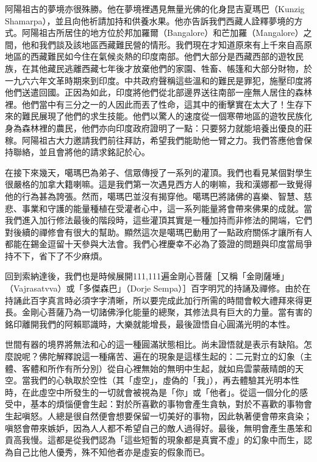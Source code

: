 阿陽祖古的夢境亦很殊勝。他在夢境裡遇見無量光佛的化身昆吉夏瑪巴（Kunzig
Shamarpa），並且向他祈請加持和供養水果。他亦告訴我們西藏人詮釋夢境的方式。阿陽祖古所居住的地方位於邦加羅爾（Bangalore）和芒加羅（Mangalore）之間，他和我們談及該地區西藏難民營的情形。我們現在才知道原來有上千來自高原地區的西藏難民如今住在氣候炎熱的印度南部。他們大部分是西藏西部的遊牧民族，在其他藏民逃離西藏七年後才放棄他們的家園、牲畜、帳篷和大部分財物，於一九六六年文革時期來到印度。中共政府聲稱這些溫和的難民是罪犯，施壓印度將他們送遣回國。正因為如此，印度將他們從北部邊界送往南部一座無人居住的森林裡。他們當中有三分之一的人因此而丟了性命，這其中的衝擊實在太大了！生存下來的難民展現了他們的求生技能。他們以驚人的速度從一個寒帶地區的遊牧民族化身為森林裡的農民，他們亦向印度政府證明了一點：只要努力就能培養出優良的莊稼。阿陽祖古大力邀請我們前往拜訪，希望我們能助他一臂之力。我們答應他會保持聯絡，並且會將他的請求銘記於心。

在接下來幾天，噶瑪巴為弟子、信眾傳授了一系列的灌頂。我們也看見某個對學生很嚴格的加拿大籍喇嘛。這是我們第一次遇見西方人的喇嘛，我和漢娜都一致覺得他的行為甚為誇張。然而，噶瑪巴並沒有揭穿他。噶瑪巴將諸佛的喜樂、智慧、慈悲、事業和守護的能量種植在受灌者心中，這一系列能量將會帶來佛果的成就。當我們進入加行修法最後的階段時，這些灌頂其實是一種加持而非修法的開端，它們對後續的禪修會有很大的幫助。顯然這次是噶瑪巴動用了一點政府關係才讓所有人都能在錫金逗留十天參與大法會。我們心裡慶幸不必為了簽證的問題與印度當局爭持不下，省下了不少麻煩。

回到索納達後，我們也是時候展開111,111遍金剛心菩薩［又稱「金剛薩埵」（Vajrasatvva）或「多傑森巴」（Dorje
Sempa）］百字明咒的持誦及禪修。由於在持誦此百字真言時必須字字清晰，所以要完成此加行所需的時間會較大禮拜來得更長。金剛心菩薩乃為一切諸佛淨化能量的總聚，其修法具有巨大的力量。當有害的銘印離開我們的阿賴耶識時，大樂就能增長，最後證悟自心圓滿光明的本性。

世間有器的境界將無法和心的這一種圓滿狀態相比。尚未證悟就是表示有缺陷。怎麼說呢？佛陀解釋說這一種痛苦、遍在的現象是這樣生起的：二元對立的幻象（主體、客體和所作有所分別）從自心裡無始的無明中生起，就如烏雲蒙蔽晴朗的天空。當我們的心執取於空性（其「虛空」，虛偽的「我」），再去體驗其光明本性時，在此虛空中所發生的一切就會被視為是「你」或「他者」。從這一個分化的感受中，基本的煩惱便會生起：對於所喜歡的事物會產生貪執，對於不喜歡的事物會生起嗔怒。人總是很自然便會想要保留一切美好的事物，因此執著便會帶來貪染；嗔怒會帶來嫉妒，因為人人都不希望自己的敵人過得好。最後，無明會產生愚笨和貢高我慢。這都是從我們認為「這些短暫的現象都是真實不虛」的幻象中而生，認為自己比他人優秀，殊不知他者亦是虛妄的假象而已。

